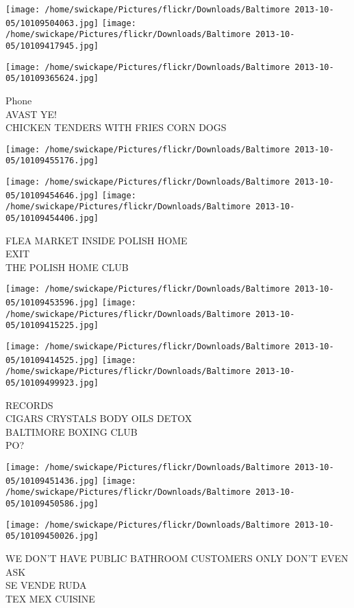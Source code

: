\documentclass[10pt,letterpaper]{article}
\begin{document}
\texttt{[image: /home/swickape/Pictures/flickr/Downloads/Baltimore 2013-10-05/10109504063.jpg]}
\texttt{[image: /home/swickape/Pictures/flickr/Downloads/Baltimore 2013-10-05/10109417945.jpg]}

\vspace{0.25in}
\texttt{[image: /home/swickape/Pictures/flickr/Downloads/Baltimore 2013-10-05/10109365624.jpg]}

Phone\\
AVAST YE!\\
CHICKEN TENDERS WITH FRIES CORN DOGS
\pagebreak

\texttt{[image: /home/swickape/Pictures/flickr/Downloads/Baltimore 2013-10-05/10109455176.jpg]}

\vspace{0.25in}
\texttt{[image: /home/swickape/Pictures/flickr/Downloads/Baltimore 2013-10-05/10109454646.jpg]}
\texttt{[image: /home/swickape/Pictures/flickr/Downloads/Baltimore 2013-10-05/10109454406.jpg]}

FLEA MARKET INSIDE POLISH HOME\\
EXIT\\
THE POLISH HOME CLUB
\pagebreak

\texttt{[image: /home/swickape/Pictures/flickr/Downloads/Baltimore 2013-10-05/10109453596.jpg]}
\texttt{[image: /home/swickape/Pictures/flickr/Downloads/Baltimore 2013-10-05/10109415225.jpg]}

\texttt{[image: /home/swickape/Pictures/flickr/Downloads/Baltimore 2013-10-05/10109414525.jpg]}
\texttt{[image: /home/swickape/Pictures/flickr/Downloads/Baltimore 2013-10-05/10109499923.jpg]}

RECORDS\\
CIGARS CRYSTALS BODY OILS DETOX\\
BALTIMORE BOXING CLUB\\
PO?
\pagebreak

\texttt{[image: /home/swickape/Pictures/flickr/Downloads/Baltimore 2013-10-05/10109451436.jpg]}
\texttt{[image: /home/swickape/Pictures/flickr/Downloads/Baltimore 2013-10-05/10109450586.jpg]}

\texttt{[image: /home/swickape/Pictures/flickr/Downloads/Baltimore 2013-10-05/10109450026.jpg]}

WE DON'T HAVE PUBLIC BATHROOM CUSTOMERS ONLY DON'T EVEN ASK\\
SE VENDE RUDA\\
TEX MEX CUISINE
\pagebreak
\end{document}
